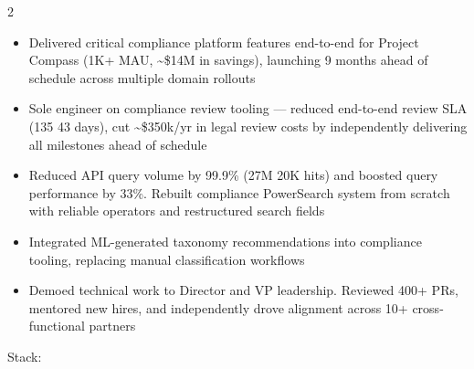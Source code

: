 \documentclass[10pt,a4paper,ragged2e,withhyper]{altacv}
\begin{document}
\begin{paracol}{2}


\begin{itemize}
\item Delivered critical compliance platform features end-to-end for Project Compass (1K+ MAU, \textasciitilde\$14M in savings), launching 9 months ahead of schedule across multiple domain rollouts
\item Sole engineer on compliance review tooling --- reduced end-to-end review SLA (135 \textrightarrow{} 43 days), cut \textasciitilde\$350k/yr in legal review costs by independently delivering all milestones ahead of schedule
\item Reduced API query volume by 99.9\% (27M \textrightarrow{} 20K hits) and boosted query performance by 33\%. Rebuilt compliance PowerSearch system from scratch with reliable operators and restructured search fields
\item Integrated ML-generated taxonomy recommendations into compliance tooling, replacing manual classification workflows
\item Demoed technical work to Director and VP leadership. Reviewed 400+ PRs, mentored new hires, and independently drove alignment across 10+ cross-functional partners
\end{itemize}

\smallskip
Stack:     







\end{paracol}
\end{document}
